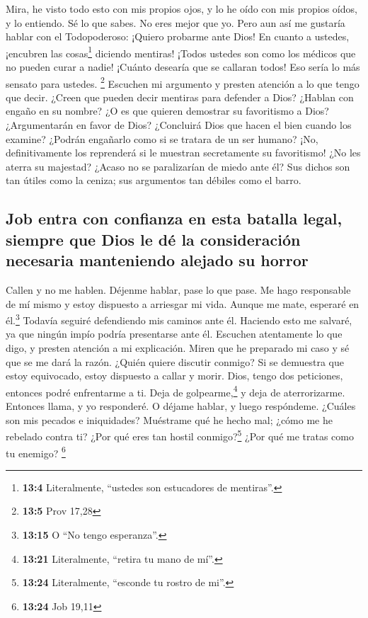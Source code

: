  Mira, he visto todo esto con mis propios ojos, y lo he
oído con mis propios oídos, y lo entiendo.  Sé lo que
sabes. No eres mejor que yo.  Pero aun así me gustaría
hablar con el Todopoderoso: ¡Quiero probarme ante Dios! 
En cuanto a ustedes, ¡encubren las cosas\footnote{\textbf{13:4}
  Literalmente, ``ustedes son estucadores de mentiras''.} diciendo
mentiras! ¡Todos ustedes son como los médicos que no pueden curar a
nadie!  ¡Cuánto desearía que se callaran todos! Eso sería
lo más sensato para ustedes. \footnote{\textbf{13:5} Prov 17,28}
 Escuchen mi argumento y presten atención a lo que tengo
que decir.  ¿Creen que pueden decir mentiras para defender
a Dios? ¿Hablan con engaño en su nombre?  ¿O es que
quieren demostrar su favoritismo a Dios? ¿Argumentarán en favor de Dios?
 ¿Concluirá Dios que hacen el bien cuando los examine?
¿Podrán engañarlo como si se tratara de un ser humano? 
¡No, definitivamente los reprenderá si le muestran secretamente su
favoritismo!  ¿No les aterra su majestad? ¿Acaso no se
paralizarían de miedo ante él?  Sus dichos son tan útiles
como la ceniza; sus argumentos tan débiles como el barro.

\hypertarget{job-entra-con-confianza-en-esta-batalla-legal-siempre-que-dios-le-duxe9-la-consideraciuxf3n-necesaria-manteniendo-alejado-su-horror}{%
\subsection{Job entra con confianza en esta batalla legal, siempre que
Dios le dé la consideración necesaria manteniendo alejado su
horror}\label{job-entra-con-confianza-en-esta-batalla-legal-siempre-que-dios-le-duxe9-la-consideraciuxf3n-necesaria-manteniendo-alejado-su-horror}}

 Callen y no me hablen. Déjenme hablar, pase lo que pase.
 Me hago responsable de mí mismo y estoy dispuesto a
arriesgar mi vida.  Aunque me mate, esperaré en
él.\footnote{\textbf{13:15} O ``No tengo esperanza''.} Todavía seguiré
defendiendo mis caminos ante él.  Haciendo esto me
salvaré, ya que ningún impío podría presentarse ante él. 
Escuchen atentamente lo que digo, y presten atención a mi explicación.
 Miren que he preparado mi caso y sé que se me dará la
razón.  ¿Quién quiere discutir conmigo? Si se demuestra
que estoy equivocado, estoy dispuesto a callar y morir. 
Dios, tengo dos peticiones, entonces podré enfrentarme a ti.
 Deja de golpearme,\footnote{\textbf{13:21} Literalmente,
  ``retira tu mano de mí''.} y deja de aterrorizarme. 
Entonces llama, y yo responderé. O déjame hablar, y luego respóndeme.
 ¿Cuáles son mis pecados e iniquidades? Muéstrame qué he
hecho mal; ¿cómo me he rebelado contra ti?  ¿Por qué eres
tan hostil conmigo?\footnote{\textbf{13:24} Literalmente, ``esconde tu
  rostro de mi''.} ¿Por qué me tratas como tu enemigo? \footnote{\textbf{13:24}
  Job 19,11}

